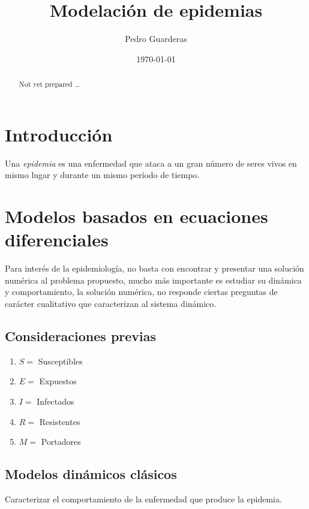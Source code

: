 \documentclass[a4paper, 10pt, twoside]{article}
\title{\fontsize{20}{20}\selectfont \textbf{Modelación de epidemias}}
\author{Pedro Guarderas}
\date{\today}
\begin{document}
\pagestyle{artsecstyle}

\maketitle
\tableofcontents

\begin{abstract}
Not yet prepared \ldots
\end{abstract}

\clearpage
\pagestyle{artstyle}
\section{Introducción}

\begin{definition}
Una \emph{epidemia} es una enfermedad que ataca a un gran número de seres vivos en mismo lugar y 
durante un mismo período de tiempo.
\end{definition}

\clearpage
\section{Modelos basados en ecuaciones diferenciales}
Para interés de la epidemiología, no basta con encontrar y presentar una solución numérica al 
problema propuesto, mucho más importante es estudiar su dinámica y comportamiento, la solución 
numérica, no responde ciertas preguntas de carácter cualitativo que caracterizan al sistema 
dinámico.

\subsection{Consideraciones previas}
\begin{enumerate}
	\item $S=$ Susceptibles
	\item $E=$ Expuestos
	\item $I=$ Infectados
	\item $R=$ Resistentes
	\item $M=$ Portadores
\end{enumerate}

\subsection{Modelos dinámicos clásicos}
Caracterizar el comportamiento de la enfermedad que produce la epidemia. 
\end{document}
